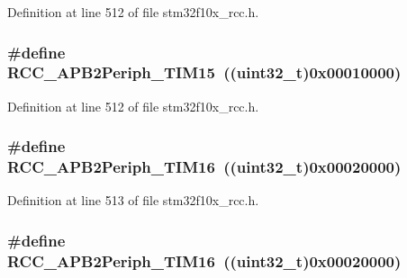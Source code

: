 Definition at line 512 of file stm32f10x\+\_\+rcc.\+h.

\subsubsection[{\texorpdfstring{R\+C\+C\+\_\+\+A\+P\+B2\+Periph\+\_\+\+T\+I\+M15}{RCC_APB2Periph_TIM15}}]{\setlength{\rightskip}{0pt plus 5cm}\#define R\+C\+C\+\_\+\+A\+P\+B2\+Periph\+\_\+\+T\+I\+M15~(({\bf uint32\+\_\+t})0x00010000)}\hypertarget{group___a_p_b2__peripheral_ga774f9082c3331890c06b9fd9deafe549}{}\label{group___a_p_b2__peripheral_ga774f9082c3331890c06b9fd9deafe549}


Definition at line 512 of file stm32f10x\+\_\+rcc.\+h.

\subsubsection[{\texorpdfstring{R\+C\+C\+\_\+\+A\+P\+B2\+Periph\+\_\+\+T\+I\+M16}{RCC_APB2Periph_TIM16}}]{\setlength{\rightskip}{0pt plus 5cm}\#define R\+C\+C\+\_\+\+A\+P\+B2\+Periph\+\_\+\+T\+I\+M16~(({\bf uint32\+\_\+t})0x00020000)}\hypertarget{group___a_p_b2__peripheral_ga739d0a5fe583f07f5b6fa320f2d2e53a}{}\label{group___a_p_b2__peripheral_ga739d0a5fe583f07f5b6fa320f2d2e53a}


Definition at line 513 of file stm32f10x\+\_\+rcc.\+h.

\subsubsection[{\texorpdfstring{R\+C\+C\+\_\+\+A\+P\+B2\+Periph\+\_\+\+T\+I\+M16}{RCC_APB2Periph_TIM16}}]{\setlength{\rightskip}{0pt plus 5cm}\#define R\+C\+C\+\_\+\+A\+P\+B2\+Periph\+\_\+\+T\+I\+M16~(({\bf uint32\+\_\+t})0x00020000)}\hypertarget{group___a_p_b2__peripheral_ga739d0a5fe583f07f5b6fa320f2d2e53a}{}\label{group___a_p_b2__peripheral_ga739d0a5fe583f07f5b6fa320f2d2e53a}


